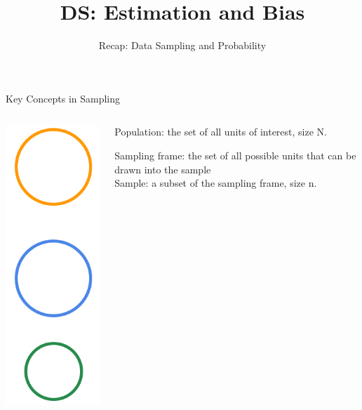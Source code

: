\documentclass[aspectratio=169]{../latex_main/tntbeamer}  %
\title[Statistics]{DS: Estimation and Bias}
\subtitle{Recap: Data Sampling and Probability}
\begin{document}
	
	\maketitle
	\begin{frame}{Key Concepts in Sampling}
	    \begin{columns}
	        \begin{column}{.4\textwidth}
	        
	                \flushright
	               \includegraphics[scale=.4]{Bild2}
	               
	        \end{column}
	        
	        \begin{column}{.6\textwidth}
	            
	            \bigskip
	            Population: the set of all units of interest, size N.\\
	            \bigskip
	            \bigskip
	            \bigskip
	            \bigskip
	            \bigskip
	        
	            Sampling frame: the set of all possible units that can be drawn into the sample\\
	            \bigskip
	            \bigskip
	            \bigskip
	            Sample: a subset of the sampling frame, size n.
	        \end{column}
	        
	    \end{columns}
	    
	\end{frame}
	
\end{document}
